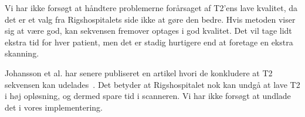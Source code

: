 Vi har ikke forsøgt at håndtere problemerne forårsaget af T2’ens lave kvalitet, da det er et valg fra Rigshospitalets side ikke at gøre den bedre. Hvis metoden viser sig at være god, kan sekvensen fremover optages i god kvalitet. Det vil tage lidt ekstra tid for hver patient, men det er stadig hurtigere end at foretage en ekstra skanning.

Johansson et al. har senere publiseret en artikel hvori de konkludere at T2 sekvensen kan udelades~\cite{bettersCT}.  Det betyder at Rigshospitalet nok kan undgå at lave T2 i høj opløsning, og dermed spare tid i scanneren. Vi har ikke forsøgt at undlade det i vores implementering.